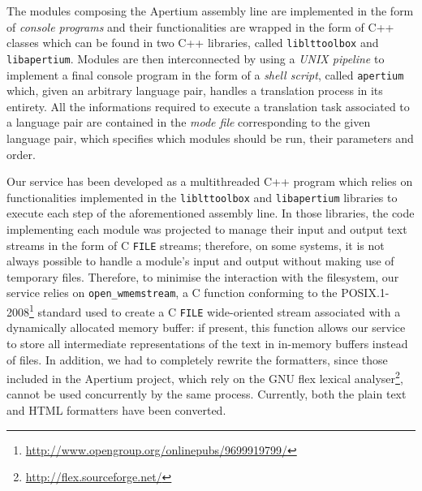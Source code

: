 \documentclass[11pt]{article}
\begin{document}


The modules composing the Apertium assembly line are implemented in the form of \emph{console programs} and their functionalities are wrapped in the form of C++ classes which can be found in two C++ libraries, called {\tt\small liblttoolbox} and {\tt\small libapertium}.
Modules are then interconnected by using a \emph{UNIX pipeline} to implement a final console program in the form of a \emph{shell script}, called {\tt\small apertium} which, given an arbitrary language pair, handles a translation process in its entirety. All the informations required to execute a translation task associated to a language pair are contained in the \emph{mode file} corresponding to the given language pair, which specifies which modules should be run, their parameters and order.

Our service has been developed as a multithreaded C++ program which relies on functionalities 
implemented in the {\tt\small liblttoolbox} and {\tt\small libapertium} libraries to execute 
each step of the aforementioned assembly line. In those libraries, the code implementing each
module was projected to manage their input and output text streams in the form of 
C {\small\tt FILE} streams; therefore, on some systems, it is not always possible to handle a 
module's input and output without making use of temporary files.
Therefore, to minimise the interaction with the filesystem, our service relies on 
{\small\tt open\_wmemstream}, a C function conforming to the POSIX.1-2008\footnote{\small\url{http://www.opengroup.org/onlinepubs/9699919799/}} standard used to create a C 
{\small\tt FILE} wide-oriented stream associated with a dynamically allocated memory 
buffer: if present, this function allows our service to store all intermediate 
representations of the text in in-memory buffers instead of files. 
In addition, we had to completely rewrite the formatters, since those included in the 
Apertium project, which rely on the GNU flex lexical 
analyser\footnote{\small\url{http://flex.sourceforge.net/}}, cannot be used concurrently 
by the same process. Currently, both the plain text and HTML formatters have been
converted.
\end{document}
